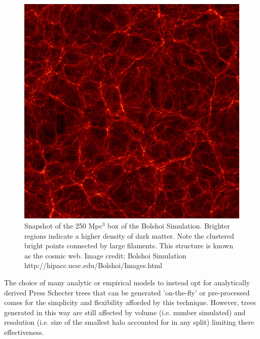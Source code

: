 \begin{figure}[h]
    \centering
    \includegraphics[width = \linewidth]{Figures/Chapter2/Bolshoi.jpg}
    \caption{Snapshot of the 250 Mpc$^3$ box of the Bolshoi Simulation. Brighter regions indicate a higher density of dark matter. Note the clustered bright points connected by large filaments. This structure is known as the cosmic web.
    Image credit: Bolshoi Simulation http://hipacc.ucsc.edu/Bolshoi/Images.html}
    \label{fig:Bolshoi}
\end{figure}

The choice of many analytic or empirical models to instead opt for analytically derived Press Schecter trees that can be generated 'on-the-fly' or pre-processed comes for the simplicity and flexibility afforded by this technique. However, trees generated in this way are still affected by volume (i.e. number simulated) and resolution (i.e. size of the smallest halo accounted for in any split) limiting there effectiveness.

